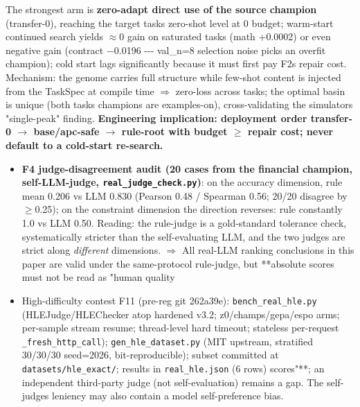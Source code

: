 The strongest arm is \textbf{zero-adapt direct use of the source champion} (transfer-0), reaching the target task\textquotesingle s zero-shot level at 0 budget; warm-start continued search yields \(\approx\)0 gain on saturated tasks (math +0.0002) or even negative gain (contract \(-\)0.0196 -\/-\/- val\_n=8 selection noise picks an overfit champion); cold start lags significantly because it must first pay F2\textquotesingle s repair cost. Mechanism: the genome carries full structure while few-shot content is injected from the TaskSpec at compile time \(\Rightarrow\) zero-loss across tasks; the optimal basin is unique (both tasks\textquotesingle{} champions are examples-on), cross-validating the simulator\textquotesingle s "single-peak" finding. \textbf{Engineering implication: deployment order transfer-0 \(\rightarrow\) base/apc-safe \(\rightarrow\) rule-root with budget \(\geq\) repair cost; never default to a cold-start re-search.}

\begin{itemize}
\tightlist
\item
  \textbf{F4 judge-disagreement audit (20 cases from the financial champion, self-LLM-judge, \texttt{real\_judge\_check.py})}: on the accuracy dimension, rule mean 0.206 vs LLM 0.830 (Pearson 0.48 / Spearman 0.56; 20/20 disagree by \(\geq\)0.25); on the constraint dimension the direction reverses: rule constantly 1.0 vs LLM 0.50. Reading: the rule-judge is a gold-standard tolerance check, systematically stricter than the self-evaluating LLM, and the two judges are strict along \emph{different} dimensions. \(\Rightarrow\) All real-LLM ranking conclusions in this paper are valid under the same-protocol rule-judge, but **absolute scores must not be read as "human quality
\end{itemize}

\begin{itemize}
\tightlist
\item[$\boxtimes$]
  High-difficulty contest F11 (pre-reg git 262a39e): \texttt{bench\_real\_hle.py} (HLEJudge/HLEChecker atop hardened v3.2; z0/champs/gepa/espo arms; per-sample stream resume; thread-level hard timeout; stateless per-request \texttt{\_fresh\_http\_call}); \texttt{gen\_hle\_dataset.py} (MIT upstream, stratified 30/30/30 seed=2026, bit-reproducible); subset committed at \texttt{datasets/hle\_exact/}; results in \texttt{real\_hle.json} (6 rows) scores"**; an independent third-party judge (not self-evaluation) remains a gap. The self-judge\textquotesingle s leniency may also contain a model self-preference bias.
\end{itemize}

